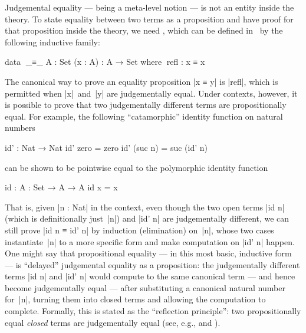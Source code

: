 Judgemental equality --- being a meta-level notion --- is not an entity inside the theory.
To state equality between two terms as a proposition and have proof for that proposition inside the theory, we need , which can be defined in \Agda\ by the following inductive family:
\begin{code}
data ^^^_≡_ {A : Set} (x : A) : A → Set where
  ^^^refl : x ≡ x
\end{code}
The canonical way to prove an equality proposition |x ≡ y| is |refl|, which is permitted when |x|~and~|y| are judgementally equal.
Under contexts, however, it is possible to prove that two judgementally different terms are propositionally equal.
For example, the following ``catamorphic'' identity function on natural numbers
\begin{code}
id' : Nat → Nat
id' zero     = zero
id' (suc n)  = suc (id' n)
\end{code}
can be shown to be pointwise equal to the polymorphic identity function
\begin{code}
id : {A : Set} → A → A
id x = x
\end{code}
That is, given |n : Nat| in the context, even though the two open terms |id n| (which is definitionally just~|n|) and |id' n| are judgementally different, we can still prove |id n ≡ id' n| by induction (elimination) on~|n|, whose two cases instantiate~|n| to a more specific form and make computation on |id' n| happen.
One might say that propositional equality --- in this most basic, inductive form --- is ``delayed'' judgemental equality as a proposition:
the judgementally different terms |id n| and |id' n| would compute to the same canonical term --- and hence become judgementally equal --- after substituting a canonical natural number for~|n|, turning them into closed terms and allowing the computation to complete.
Formally, this is stated as the ``reflection principle'': two propositionally equal \emph{closed} terms are judgementally equal (see, e.g., \citet[Section~5.1.3]{Luo-type-theory} and \citet[Section~1.1]{Streicher-ITT}).

